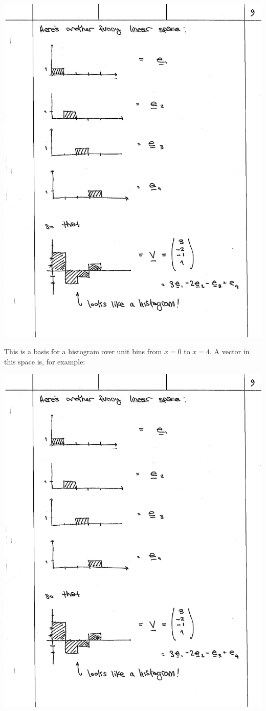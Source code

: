 \begin{center}
\includegraphics[width=.45\textwidth]{figures/lec02_e4.pdf}
\end{center}

\noindent This is a basis for a histogram over unit bins from $x=0$ to $x=4$. A vector in this space is, for example:

\begin{center}
\includegraphics[width=.8\textwidth]{figures/lec02_hist.pdf}
\end{center}

